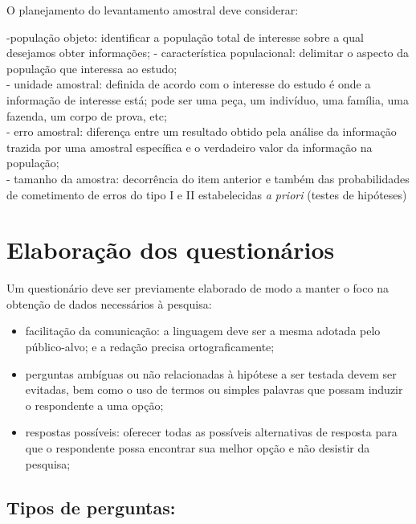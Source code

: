 \documentclass[
]{book}
\providecommand{\tightlist}{%
  \setlength{\itemsep}{0pt}\setlength{\parskip}{0pt}}
\begin{document}
O planejamento do levantamento amostral deve considerar:

\hfill\break

-população objeto: identificar a população total de interesse sobre a qual desejamos obter informações;
- característica populacional: delimitar o aspecto da população que interessa ao estudo;\\
- unidade amostral: definida de acordo com o interesse do estudo é onde a informação de interesse está; pode ser uma peça, um indivíduo, uma família, uma fazenda, um corpo de prova, etc;\\
- erro amostral: diferença entre um resultado obtido pela análise da informação trazida por uma amostral específica e o verdadeiro valor da informação na população;\\
- tamanho da amostra: decorrência do item anterior e também das probabilidades de cometimento de erros do tipo I e II estabelecidas \emph{a priori} (testes de hipóteses)

\hfill\break

\hypertarget{elaborauxe7uxe3o-dos-questionuxe1rios}{%
\section{Elaboração dos questionários}\label{elaborauxe7uxe3o-dos-questionuxe1rios}}

\hfill\break

Um questionário deve ser previamente elaborado de modo a manter o foco na obtenção de dados necessários à pesquisa:

\hfill\break

\begin{itemize}
\tightlist
\item
  facilitação da comunicação: a linguagem deve ser a mesma adotada pelo público-alvo; e a redação precisa ortograficamente;
\item
  perguntas ambíguas ou não relacionadas à hipótese a ser testada devem ser evitadas, bem como o uso de termos ou simples palavras que possam induzir o respondente a uma opção;
\item
  respostas possíveis: oferecer todas as possíveis alternativas de resposta para que o respondente possa encontrar sua melhor opção e não desistir da pesquisa;
\end{itemize}

\hypertarget{tipos-de-perguntas}{%
\subsection{Tipos de perguntas:}\label{tipos-de-perguntas}}
\end{document}

